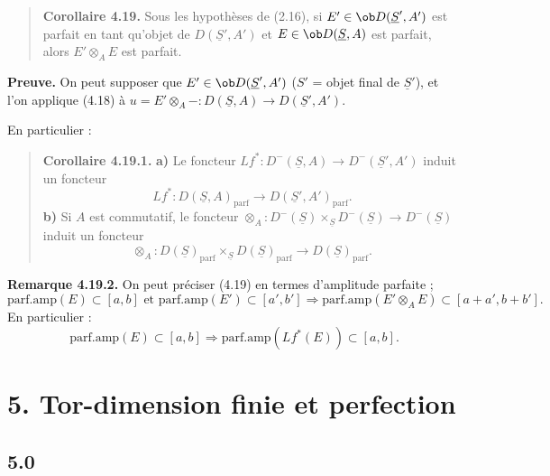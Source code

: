 \begin{quote}
\textbf{Corollaire 4.19.} Sous les hypothèses de (2.16), si $E' \in \ob D(\underline{S}', A')$ est parfait en tant qu'objet de $D(\underline{S}', A')$ et $E \in \ob D(\underline{S}, A)$ est parfait, alors $E' \otimes_A E$ est parfait.
\end{quote}

\textbf{Preuve.} On peut supposer que $E' \in \ob D(\underline{S}', A')$ ($S'$ = objet final de $\underline{S}'$), et l'on applique (4.18) à $u = E' \otimes_A - : D(\underline{S}, A) \to D(\underline{S}', A')$.

En particulier :

\begin{quote}
\textbf{Corollaire 4.19.1.}
\textbf{a)} Le foncteur $Lf^* : D^-(\underline{S}, A) \to D^-(\underline{S}', A')$ induit un foncteur
\[
Lf^* : D(\underline{S}, A)_{\mathrm{parf}} \longrightarrow D(\underline{S}', A')_{\mathrm{parf}}.
\]
\textbf{b)} Si $A$ est commutatif, le foncteur $\otimes_A : D^-(\underline{S}) \times_{\underline{S}} D^-(\underline{S}) \to D^-(\underline{S})$ induit un foncteur
\[
\otimes_A : D(\underline{S})_{\mathrm{parf}} \times_{\underline{S}} D(\underline{S})_{\mathrm{parf}} \longrightarrow D(\underline{S})_{\mathrm{parf}}.
\]
\end{quote}

\textbf{Remarque 4.19.2.} On peut préciser (4.19) en termes d'amplitude parfaite ;
\[
\mathrm{parf.amp}(E) \subset [a, b] \text{ et } \mathrm{parf.amp}(E') \subset [a', b'] \Rightarrow \mathrm{parf.amp}(E' \otimes_A E) \subset [a+a', b+b'].
\]
En particulier :
\[
\mathrm{parf.amp}(E) \subset [a, b] \Rightarrow \mathrm{parf.amp}(Lf^*(E)) \subset [a, b].
\]

\section*{5. Tor-dimension finie et perfection}

\subsection*{5.0}

